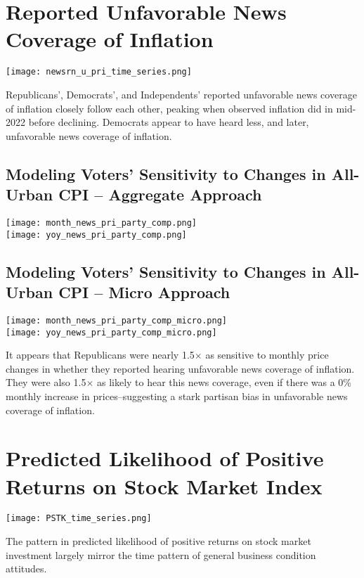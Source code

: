 \documentclass{article}
\begin{document}
\section{Reported Unfavorable News Coverage of Inflation}
\centering \texttt{[image: newsrn\_u\_pri\_time\_series.png]} \\
\raggedright Republicans', Democrats', and Independents' reported unfavorable news coverage of inflation closely follow each other, peaking when observed inflation did in mid-2022 before declining. Democrats appear to have heard less, and later, unfavorable news coverage of inflation.

\subsection{Modeling Voters' Sensitivity to Changes in All-Urban CPI -- Aggregate Approach}
\centering \texttt{[image: month\_news\_pri\_party\_comp.png]} \\
\texttt{[image: yoy\_news\_pri\_party\_comp.png]} \\
\raggedright 

\subsection{Modeling Voters' Sensitivity to Changes in All-Urban CPI -- Micro Approach}
\centering \texttt{[image: month\_news\_pri\_party\_comp\_micro.png]} \\
\texttt{[image: yoy\_news\_pri\_party\_comp\_micro.png]} \\
\raggedright It appears that Republicans were nearly 1.5$\times$ as sensitive to monthly price changes in whether they reported hearing unfavorable news coverage of inflation. They were also 1.5$\times$ as likely to hear this news coverage, even if there was a 0\% monthly increase in prices--suggesting a stark partisan bias in unfavorable news coverage of inflation.

\section{Predicted Likelihood of Positive Returns on Stock Market Index}
\centering \texttt{[image: PSTK\_time\_series.png]} \\
\raggedright The pattern in predicted likelihood of positive returns on stock market investment largely mirror the time pattern of general business condition attitudes.
\end{document}
